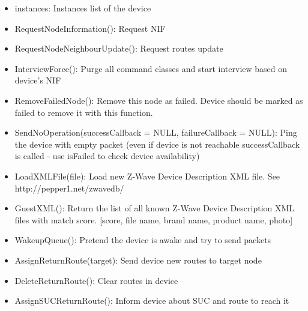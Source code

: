 \begin {itemize}
\begin {itemize}
\begin {itemize}
\item givenName: name for Expert UI
\item isFailed: is failed
\item failureCount: number of tries since last device failed
\item lastRecevied: timestamp of last packet received
\item lastSend: timestamp of last sent operation
\item lastPacketInfo: structure with deliveryTime, delivered and packetLength information about last packet sent
\item queueLength: length of device specific send queue (if countJobs is enabled)
\item lastNonceGet: internal
\item acceptSetSecurityLevel: minimal security level that is accepted for Set commands from the device: 0 - accept both secure S0/S2 or unsecure Set commands, 128 - accept S0 and all S2 levels, 1 - accept all S2 levels (Unauthenticated, Authenticated and Access), 2 - accept S2 Authenticated and S2 Access, 4 - accept only S2 Access
\end {itemize}

\item instances: Instances list of the device
\item RequestNodeInformation(): Request NIF
\item RequestNodeNeighbourUpdate(): Request routes update
\item InterviewForce(): Purge all command classes and start interview based on device's NIF
\item RemoveFailedNode(): Remove this node as failed. Device should be marked as failed to remove it with this function.
\item SendNoOperation(successCallback = NULL, failureCallback = NULL): Ping the device with empty packet (even if device is not reachable successCallback is called - use isFailed to check device availability)
\item LoadXMLFile(file): Load new Z-Wave Device Description XML file. See http://pepper1.net/zwavedb/
\item GuestXML(): Return the list of all known Z-Wave Device Description XML files with match score. [score, file name, brand name, product name, photo]
\item WakeupQueue(): Pretend the device is awake and try to send packets
\item AssignReturnRoute(target): Send device new routes to target node
\item DeleteReturnRoute(): Clear routes in device
\item AssignSUCReturnRoute(): Inform device about SUC and route to reach it
\end {itemize}
\end {itemize}

